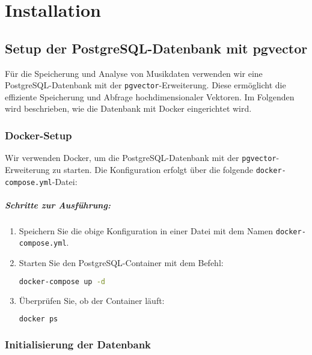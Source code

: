 \chapter{Installation}

\section{Setup der PostgreSQL-Datenbank mit pgvector}

Für die Speicherung und Analyse von Musikdaten verwenden wir eine PostgreSQL-Datenbank mit der \texttt{pgvector}-Erweiterung\cite{pgvector}. Diese ermöglicht die effiziente Speicherung und Abfrage hochdimensionaler Vektoren. Im Folgenden wird beschrieben, wie die Datenbank mit Docker eingerichtet wird.

\subsection{Docker-Setup}

Wir verwenden Docker\cite{docker}, um die PostgreSQL-Datenbank mit der \texttt{pgvector}-Erweiterung zu starten. Die Konfiguration erfolgt über die folgende \texttt{docker-compose.yml}-Datei:




\paragraph{Schritte zur Ausführung:}
\begin{enumerate}
    \item Speichern Sie die obige Konfiguration in einer Datei mit dem Namen \texttt{docker-compose.yml}.
    \item Starten Sie den PostgreSQL-Container mit dem Befehl:
    \begin{lstlisting}[language=bash]
    docker-compose up -d
    \end{lstlisting}
    \item Überprüfen Sie, ob der Container läuft:
    \begin{lstlisting}[language=bash]
    docker ps
    \end{lstlisting}
\end{enumerate}

\subsection{Initialisierung der Datenbank}


